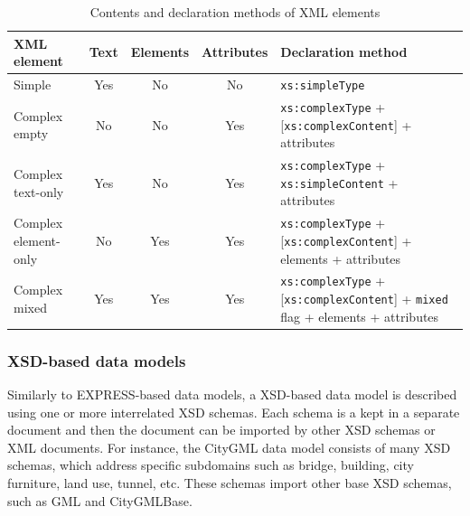 \begin{table}[h]\footnotesize
    \centering
    \caption{Contents and declaration methods of XML elements}
    \label{tab:xml-elements}
    

    \begin{tabu} to \textwidth { l | c c c | X }
        \hline
            XML element             &   Text    &   Elements    &   Attributes      &   Declaration method     \\
        \hline
            Simple                  &   Yes     &   No          &   No              &   \texttt{xs:simpleType}                       \\
            Complex empty           &   No      &   No          &   Yes             &   \texttt{xs:complexType} + [\texttt{xs:complexContent}] + attributes \\
            Complex text-only       &   Yes     &   No          &   Yes             &   \texttt{xs:complexType} + \texttt{xs:simpleContent}  + attributes \\
            Complex element-only    &   No      &   Yes         &   Yes             &   \texttt{xs:complexType} + [\texttt{xs:complexContent}] + elements + attributes \\
            Complex mixed           &   Yes     &   Yes         &   Yes             &   \texttt{xs:complexType} + [\texttt{xs:complexContent}] + \newline \texttt{mixed} flag + elements + attributes \\
        \hline
    \end{tabu}
\end{table}

\subsubsection{XSD-based data models}\label{sec:xsd-based-data-models}


Similarly to EXPRESS-based data models, a XSD-based data model is described using one or more interrelated XSD schemas.
Each schema is a kept in a separate document and then the document can be imported by other XSD schemas or XML documents.
For instance, the CityGML data model consists of many XSD schemas, which address specific subdomains such as bridge, building, city furniture, land use, tunnel, etc.
These schemas import other base XSD schemas, such as GML and CityGMLBase.



